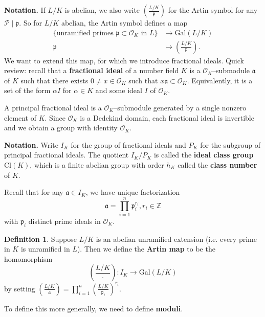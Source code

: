 \documentclass{article}
\theoremstyle{definition}
\newtheorem{defn}{Definition}[section]
\begin{document}
\textbf{Notation.} If $L/K$ is abelian, we also write $\left(\frac{L/K}{\mathfrak{p}}\right)$ for the Artin symbol for any $\mathcal{P} \mid \mathfrak{p}$. So for $L/K$ abelian, the Artin symbol defines a map 
\begin{align*}
    \{\text{unramified primes }\mathfrak{p} \subset \mathcal{O}_K \text{ in }L\} &\to \text{Gal}(L/K) \\
    \mathfrak{p} &\mapsto \left(\frac{L/K}{\mathfrak{p}}\right).
\end{align*}
We want to extend this map, for which we introduce fractional ideals. Quick review: recall that a \textbf{fractional ideal} of a number field $K$ is a $\mathcal{O}_K$--submodule $\mathfrak{a}$ of $K$ such that there exists $0 \neq x \in \mathcal{O}_K$ such that $x \mathfrak{a} \subset \mathcal{O}_K$. Equivalently, it is a set of the form $\alpha I$ for $\alpha \in K$ and some ideal $I$ of $\mathcal{O}_K$.
\vspace{1mm}
 
A principal fractional ideal is a $\mathcal{O}_K$--submodule generated by a single nonzero element of $K$. Since $\mathcal{O}_K$ is a Dedekind domain, each fractional ideal is invertible and we obtain a group with identity $\mathcal{O}_K$.
\vspace{1mm}
 
\textbf{Notation.} Write $I_K$ for the group of fractional ideals and $P_K$ for the subgroup of principal fractional ideals. The quotient $I_K/P_K$ is called the \textbf{ideal class group} $\text{Cl}(K)$, which is a finite abelian group with order $h_K$ called the \textbf{class number} of $K$.
\vspace{1mm}
 
Recall that for any $\mathfrak{a} \in I_K$, we have unique factorization \[
\mathfrak{a} = \prod_{i=1}^{n} \mathfrak{p}_i^{r_i}, r_i \in \mathbb{Z}
\]
with $\mathfrak{p}_i$ distinct prime ideals in $\mathcal{O}_K$.

\begin{defn}
    Suppose $L/K$ is an abelian unramified extension (i.e. every prime in $K$ is unramified in $L$). Then we define the \textbf{Artin map} to be the homomorphism \[
    \left(\frac{L/K}{\cdot }\right) : I_K \to \text{Gal}(L/K)
    \]
    by setting $\left(\frac{L/K}{\mathfrak{a}}\right) = \prod_{i=1}^{n} \left(\frac{L/K}{\mathfrak{p}_i}\right)^{r_i}$.
\end{defn}
To define this more generally, we need to define \textbf{moduli}.
\vspace{1mm}
 
\end{document}

